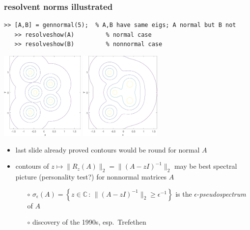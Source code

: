 \documentclass[10pt,hyperref]{beamer}
\newcommand{\CC}{\mathbb{C}}
\newcommand{\eps}{\epsilon}
\begin{document}
\begin{frame}[fragile]
\frametitle{resolvent norms illustrated}

\begin{Verbatim}[fontsize=\footnotesize]
   >> [A,B] = gennormal(5);  % A,B have same eigs; A normal but B not
   >> resolveshow(A)         % normal case
   >> resolveshow(B)         % nonnormal case
\end{Verbatim}

\bigskip
\begin{center}
\includegraphics[width=0.31\textwidth]{figs/resolvenormal} \hspace{20mm} \includegraphics[width=0.3\textwidth]{figs/resolvenonnormal}
\end{center}

\small
\begin{itemize}
\item last slide already proved contours would be round for normal $A$
\item contours of $z\mapsto\|R_z(A)\|_2= \|(A-z I)^{-1}\|_2$ may be best spectral picture (personality test?) for nonnormal matrices $A$
    \begin{itemize}
    \item[$\circ$] $\sigma_\eps(A) = \left\{z\in\CC\,:\, \|(A-z I)^{-1}\|_2 \ge \eps^{-1}\right\}$ is the $\eps$-\emph{pseudospectrum} of $A$
    \item[$\circ$] discovery of the 1990s, esp.~Trefethen
    \end{itemize}
\end{itemize}
\end{frame}
\end{document}
